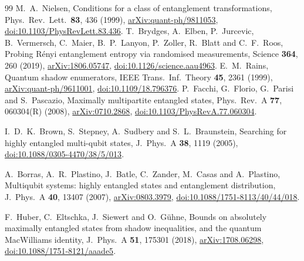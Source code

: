 \documentclass[11pt]{article}
\begin{document}
\begin{thebibliography}{99}
 M.~A.~Nielsen, Conditions for a class of entanglement transformations, Phys.\ Rev.\ Lett.\
\textbf{83}, 436 (1999), \href{https://arxiv.org/abs/quant-ph/9811053}{arXiv:quant-ph/9811053}, \href{https://doi.org/10.1103/PhysRevLett.83.436}{doi:10.1103/PhysRevLett.83.436}.
\bibitem{Brydges19} T.~Brydges, A.~Elben, P.~Jurcevic, B.~Vermersch, C.~Maier, B.~P.~Lanyon, P.~Zoller, R.~Blatt and
C.~F.~Roos, Probing R\'enyi entanglement entropy via randomised measurements, Science \textbf{364}, 260 (2019), \href{https://arxiv.org/abs/1806.05747}{arXiv:1806.05747}, \href{https://doi.org/10.1126/science.aau4963}{doi:10.1126/science.aau4963}.
\bibitem{Rains} E.~M.~Rains, Quantum shadow enumerators, IEEE Trans.\ Inf.\ Theory \textbf{45}, 2361
(1999), \href{https://arxiv.org/abs/quant-ph/9611001}{arXiv:quant-ph/9611001}, \href{https://doi.org/10.1109/18.796376}{doi:10.1109/18.796376}.
\bibitem{FFPP} P.~Facchi, G.~Florio, G.~Parisi and S.~Pascazio, Maximally multipartite entangled states, Phys.\ Rev.\ A
\textbf{77}, 060304(R) (2008), \href{https://arxiv.org/abs/0710.2868}{arXiv:0710.2868}, \href{https://doi.org/10.1103/PhysRevA.77.060304}{doi:10.1103/PhysRevA.77.060304}.

 I.~D.~K.~Brown, S.~Stepney, A.~Sudbery and S.~L.~Braunstein, Searching for highly entangled multi-qubit
states, J.\ Phys.\ A \textbf{38}, 1119 (2005), \href{https://doi.org/10.1088/0305-4470/38/5/013}{doi:10.1088/0305-4470/38/5/013}.

 A.~Borras, A.~R.~Plastino, J.~Batle, C.~Zander, M.~Casas and A.~Plastino, Multiqubit systems: highly
entangled states and entanglement distribution, J.\ Phys.\ A \textbf{40}, 13407 (2007),
\href{https://arxiv.org/abs/0803.3979}{arXiv:0803.3979}, \href{https://doi.org/10.1088/1751-8113/40/44/018}{doi:10.1088/1751-8113/40/44/018}.

 F.~Huber, C.~Eltschka, J.~Siewert and O.~G\"uhne, Bounds on absolutely maximally entangled states from
shadow inequalities, and the quantum MacWilliams identity, J.\ Phys.\ A \textbf{51}, 175301 (2018),
\href{https://arxiv.org/abs/1708.06298}{arXiv:1708.06298}, \href{https://doi.org/10.1088/1751-8121/aaade5}{doi:10.1088/1751-8121/aaade5}.


\end{thebibliography}
\end{document}
